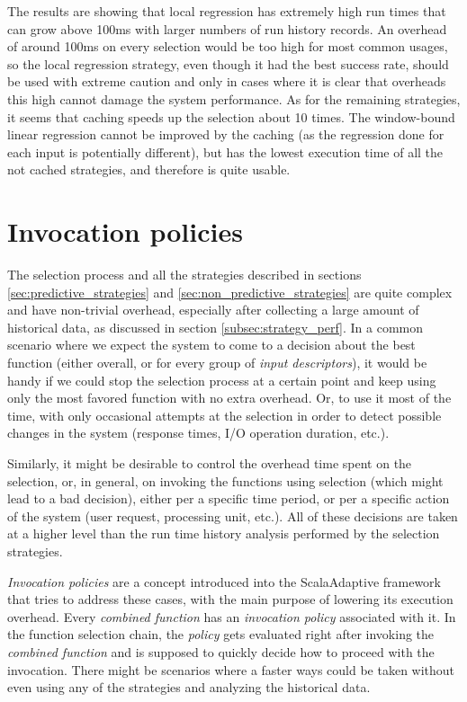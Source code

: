 The results are showing that local regression has extremely high run times that can grow above 100ms with larger numbers of run history records. An overhead of around 100ms on every selection would be too high for most common usages, so the local regression strategy, even though it had the best success rate, should be used with extreme caution and only in cases where it is clear that overheads this high cannot damage the system performance. As for the remaining strategies, it seems that caching speeds up the selection about 10 times. The window-bound linear regression cannot be improved by the caching (as the regression done for each input is potentially different), but has the lowest execution time of all the not cached strategies, and therefore is quite usable.

\section{Invocation policies}

The selection process and all the strategies described in sections \ref{sec:predictive_strategies} and \ref{sec:non_predictive_strategies} are quite complex and have non-trivial overhead, especially after collecting a large amount of historical data, as discussed in section \ref{subsec:strategy_perf}. In a common scenario where we expect the system to come to a decision about the best function (either overall, or for every group of \textit{input descriptors}), it would be handy if we could stop the selection process at a certain point and keep using only the most favored function with no extra overhead. Or, to use it most of the time, with only occasional attempts at the selection in order to detect possible changes in the system (response times, I/O operation duration, etc.).

Similarly, it might be desirable to control the overhead time spent on the selection, or, in general, on invoking the functions using selection (which might lead to a bad decision), either per a specific time period, or per a specific action of the system (user request, processing unit, etc.). All of these decisions are taken at a higher level than the run time history analysis performed by the selection strategies.  

\textit{Invocation policies} are a concept introduced into the ScalaAdaptive framework that tries to address these cases, with the main purpose of lowering its execution overhead. Every \textit{combined function} has an \textit{invocation policy} associated with it. In the function selection chain, the \textit{policy} gets evaluated right after invoking the \textit{combined function} and is supposed to quickly decide how to proceed with the invocation. There might be scenarios where a faster ways could be taken without even using any of the strategies and analyzing the historical data.


